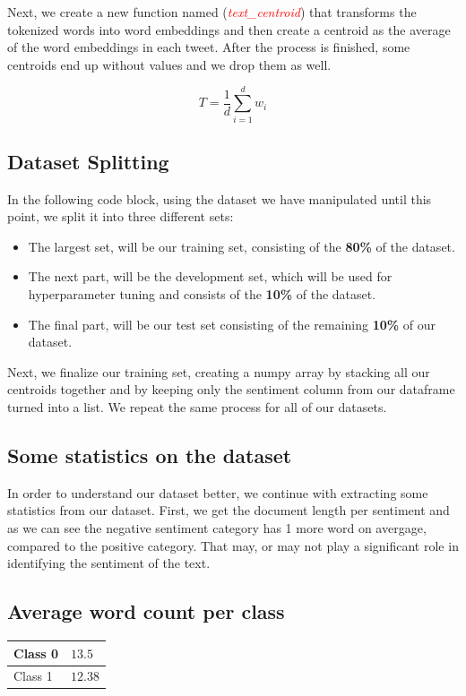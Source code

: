 \documentclass[10pt]{article}
\begin{document}
Next, we create a new function named  (\textcolor{red}{\textit{text\_centroid}}) that transforms the tokenized words into word embeddings and then create a centroid as the average of the word embeddings in each tweet. After the process is finished, some centroids end up without values and we drop them as well. 

\[
T = \frac{1}{d}\sum_{i=1}^{d}w_i
\]

\subsection*{Dataset Splitting}

In the following code block, using the dataset we have manipulated until this point, we split it into three different sets:
\begin{itemize}
\item
The largest set, will be our training set, consisting of the \textbf{80\%} of the dataset. 
\item The next part, will be the development set, which will be used for hyperparameter tuning and consists of the \textbf{10\%} of the dataset. 
\item The final part, will be our test set consisting of the remaining \textbf{10\%} of our dataset.
\end{itemize}

Next, we finalize our training set, creating a numpy array by stacking all our centroids together and by keeping only the sentiment column from our dataframe turned into a list.
We repeat the same process for all of our datasets.

\subsection*{Some statistics on the dataset}

In order to understand our dataset better, we continue with extracting some statistics from our dataset. First, we get the document length per sentiment and as we can see the negative sentiment category has 1 more word on avergage, compared to the positive category. That may, or may not play a significant role in identifying the sentiment of the text. 

\subsection*{Average word count per class }
\begin{tabular}{ |p{3cm}|p{3cm}|  }
\hline
 Class 0 & $13.5$\\\hline
 Class 1 & $12.38$\\  
\hline
\end{tabular}
\bigskip  
\end{document}
